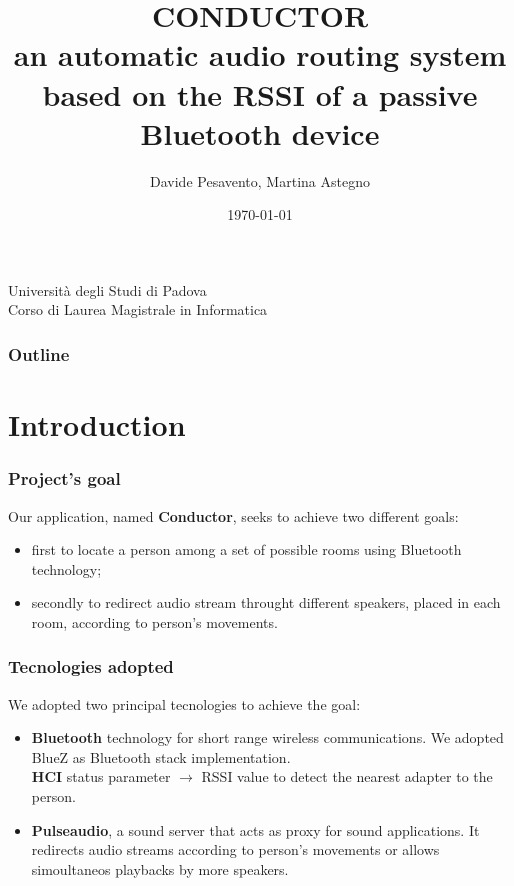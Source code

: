 \documentclass{beamer}
\title{\textbf{CONDUCTOR} \\ an automatic audio routing system based on the RSSI of a passive Bluetooth device}
\author{Davide Pesavento, Martina Astegno}
\date{\today}
\begin{document}
\begin{frame}[plain]
\titlepage
	\begin{center}
		Universit\`{a} degli Studi di Padova \\
		Corso di Laurea Magistrale in Informatica
	\end{center}
\end{frame}

\begin{frame}
	\frametitle{Outline}
	\tableofcontents
\end{frame}


\section{Introduction}

	\begin{frame}
		\frametitle{Project's goal}
		Our application, named \textbf{Conductor}, seeks to achieve two different goals:
		\pause
		\begin{itemize}
		\item first to locate a person among a set of possible rooms using Bluetooth technology;
		\pause
		\item secondly to redirect audio stream throught different speakers, placed in each room, according to person's movements.
		\end{itemize}
	\end{frame}

	\begin{frame}
		\frametitle{Tecnologies adopted}
		We adopted two principal tecnologies to achieve the goal:
		\pause
		\begin{itemize}
		\item \textbf{Bluetooth} technology for short range wireless communications. We adopted BlueZ as Bluetooth stack implementation.\\ \textbf{HCI} status parameter $\rightarrow$ RSSI value to detect the nearest adapter to the person.
		\pause
		\item \textbf{Pulseaudio}, a sound server that acts as proxy for sound applications. It redirects audio streams according to person's movements or allows simoultaneos playbacks by more speakers.

		\end{itemize}
	\end{frame}


\end{document}
